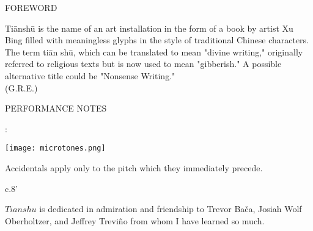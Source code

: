 \documentclass[10pt]{article}
\begin{document}
\vspace*{0.5\baselineskip}

\begin{center}
\huge FOREWORD
\end{center}

\begin{center}
Ti\=ansh\=u is the name of an art installation in the form of a book by artist Xu Bing filled with meaningless glyphs in the style of traditional Chinese characters. The term ti\=an sh\=u, which can be translated to mean "divine writing," originally referred to religious texts but is now used to mean "gibberish." A possible alternative title could be "Nonsense Writing."\\
\phantom{text} \hfill (G.R.E.)
  \end{center}
  
\vspace*{10\baselineskip}

\begin{center}
\huge PERFORMANCE NOTES
\end{center}

\begin{center}
:
\end{center}

\begin{center}
\texttt{[image: microtones.png]}
\end{center}

\begin{center}
Accidentals apply only to the pitch which they immediately precede.
\end{center}

\vspace*{28\baselineskip}

\begin{center}
c.8'
\end{center}

\vspace*{2\baselineskip}

\begin{center}
$Tianshu$ is dedicated in admiration and friendship to Trevor Ba\v{c}a, Josiah Wolf Oberholtzer, and Jeffrey Trevi\~{n}o from whom I have learned so much.
\end{center}
\end{document}
